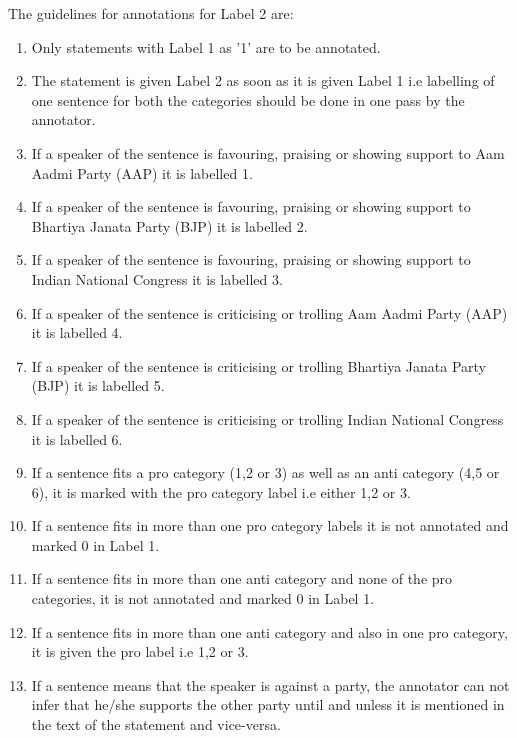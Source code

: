 \documentclass[a4paper,11pt]{article}
\begin{document}
\newpage
The guidelines for annotations for Label 2 are:
\begin{enumerate}
    \item Only statements with Label 1 as '1' are to be annotated.
    \item The statement is given Label 2 as soon as it is given Label 1 i.e labelling of one sentence for both the categories should be done in one pass by the annotator.
    \item If a speaker of the sentence is favouring, praising or showing support to Aam Aadmi Party (AAP) it is labelled 1. 
    \item If a speaker of the sentence is favouring, praising or showing support to Bhartiya Janata Party (BJP) it is labelled 2.
    \item If a speaker of the sentence is favouring, praising or showing support to Indian National Congress it is labelled 3. 
    \item If a speaker of the sentence is criticising or trolling Aam Aadmi Party (AAP) it is labelled 4. 
    \item If a speaker of the sentence is criticising or trolling Bhartiya Janata Party (BJP) it is labelled 5. 
    \item If a speaker of the sentence is criticising or trolling Indian National Congress it is labelled 6. 
    \item If a sentence fits a pro category (1,2 or 3) as well as an anti category (4,5 or 6), it is marked with the pro category label i.e either 1,2 or 3.
    \item If a sentence fits in more than one pro category labels it is not annotated and marked 0 in Label 1.
    \item If a sentence fits in more than one anti category and none of the pro categories, it is not annotated and marked 0 in Label 1.
    \item If a sentence fits in more than one anti category and also in one pro category, it is given the pro label i.e 1,2 or 3.
    \item If a sentence means that the speaker is against a party, the annotator can not infer that he/she supports the other party until and unless it is mentioned in the text of the statement and vice-versa.
\end{enumerate}
\end{document}
